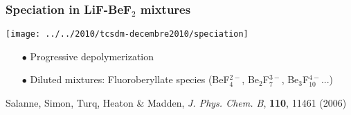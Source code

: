 \documentclass{beamer}
\begin{document}
\begin{frame}
  \frametitle{Speciation in LiF-BeF$_2$ mixtures}
  \begin{center}
   \texttt{[image: ../../2010/tcsdm-decembre2010/speciation]}
   \end{center}
   \begin{itemize}
     \item[$\bullet$] Progressive depolymerization
     \item[$\bullet$] Diluted mixtures: Fluoroberyllate species (BeF$_4^{2-}$, Be$_2$F$_7^{3-}$, Be$_3$F$_{10}^{4-}$...)
   \end{itemize}
   \vspace{0.3cm}
   \scriptsize{Salanne, Simon, Turq, Heaton \& Madden, {\it J. Phys. Chem. B}, {\bf 110}, 11461 (2006)}
\end{frame}
\end{document}
